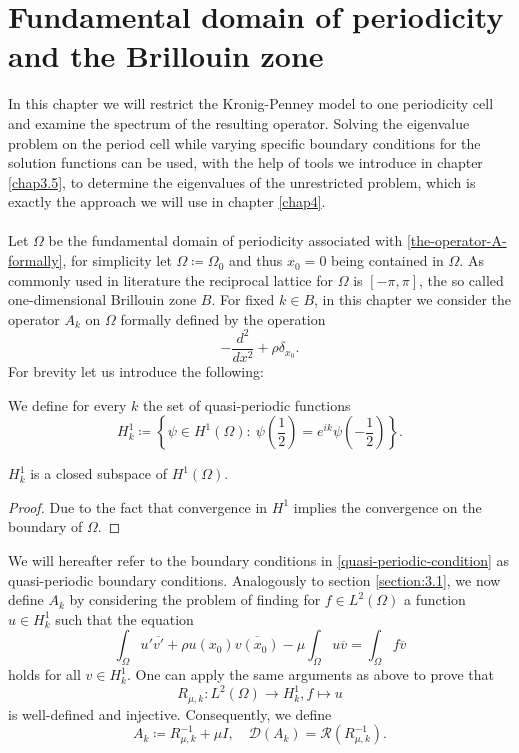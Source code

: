 \chapter{Fundamental domain of periodicity and the Brillouin zone}  \label{chap3}

In this chapter we will restrict the Kronig-Penney model to one periodicity cell and examine the spectrum of the resulting operator. Solving the eigenvalue problem on the period cell while varying specific boundary conditions for the solution functions can be used, with the help of tools we introduce in chapter \ref{chap3.5}, to determine the eigenvalues of the unrestricted problem, which is exactly the approach we will use in chapter \ref{chap4}.
~\\ ~\\
Let $\Omega$ be the fundamental domain of periodicity associated with \eqref{the-operator-A-formally}, for simplicity let $\Omega \coloneqq \Omega_{0}$ and thus $x_{0} = 0$ being contained in $\Omega$. As commonly used in literature the reciprocal lattice for $\Omega$ is $[-\pi, \pi]$, the so called one-dimensional Brillouin zone $B$. For fixed $k \in B$, in this chapter we consider the operator $A_{k}$ on $\Omega$ formally defined by the operation %
	\[ -\frac{d^{2}}{dx^{2}} + \rho \delta_{x_{0}}. \]
For brevity let us introduce the following:
\begin{definition} 
	We define for every $k$ the set of quasi-periodic functions  
	\begin{equation}
		H^{1}_{k} \coloneqq \left\{ \psi \in H^{1}(\Omega): ~ \psi\left(\frac{1}{2}\right) = e^{ik} \psi\left(-\frac{1}{2}\right) \right\}. \label{quasi-periodic-condition}
	\end{equation}
\end{definition}	
\begin{remark}
	$H^{1}_{k}$ is a closed subspace of $H^{1}(\Omega)$.
\end{remark}

\begin{proof} %
	Due to the fact that convergence in $H^{1}$ implies the convergence on the boundary of $\Omega$.
\end{proof}

We will hereafter refer to the boundary conditions in \eqref{quasi-periodic-condition} as quasi-periodic boundary conditions. Analogously to section \ref{section:3.1}, we now define $A_{k}$ by considering the problem of finding for $f \in L^{2}(\Omega)$ a function $u \in H^{1}_{k}$ such that the equation
	\[ \int_{\Omega} u' \overline{v'} + \rho u(x_{0}) \overline{v(x_{0})} - \mu \int_{\Omega} u \overline{v} = \int_{\Omega} f \overline{v} \]
holds for all $v \in H^{1}_{k}$. One can apply the same arguments as above to prove that 
	\[ R_{\mu, k} \colon L^{2}(\Omega) \rightarrow H^{1}_{k},  f \mapsto u \]
is well-defined and injective. Consequently, we define
	\[ A_{k} \coloneqq R_{\mu, k}^{-1} + \mu I, \quad \mathcal{D}(A_{k}) = \mathcal{R}(R_{\mu, k}^{-1}). \] 

